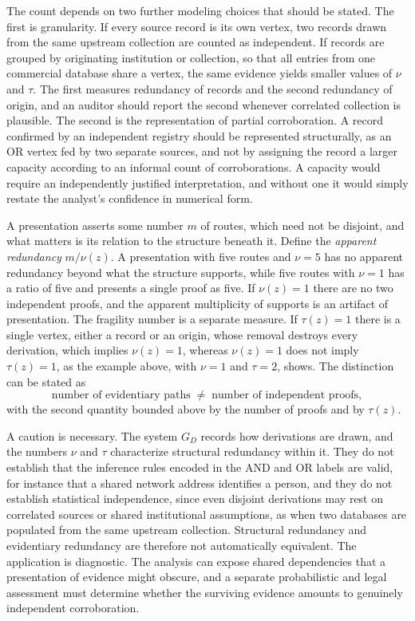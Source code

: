 \documentclass[11pt]{article}
\theoremstyle{definition}
\theoremstyle{remark}
\begin{document}
The count depends on two further modeling choices that should be stated. The first is granularity. If every source record is its own vertex, two records drawn from the same upstream collection are counted as independent. If records are grouped by originating institution or collection, so that all entries from one commercial database share a vertex, the same evidence yields smaller values of $\nu$ and $\tau$. The first measures redundancy of records and the second redundancy of origin, and an auditor should report the second whenever correlated collection is plausible. The second is the representation of partial corroboration. A record confirmed by an independent registry should be represented structurally, as an OR vertex fed by two separate sources, and not by assigning the record a larger capacity according to an informal count of corroborations. A capacity would require an independently justified interpretation, and without one it would simply restate the analyst's confidence in numerical form.

A presentation asserts some number $m$ of routes, which need not be disjoint, and what matters is its relation to the structure beneath it. Define the \emph{apparent redundancy} $m/\nu(z)$. A presentation with five routes and $\nu = 5$ has no apparent redundancy beyond what the structure supports, while five routes with $\nu = 1$ has a ratio of five and presents a single proof as five. If $\nu(z) = 1$ there are no two independent proofs, and the apparent multiplicity of supports is an artifact of presentation. The fragility number is a separate measure. If $\tau(z) = 1$ there is a single vertex, either a record or an origin, whose removal destroys every derivation, which implies $\nu(z) = 1$, whereas $\nu(z) = 1$ does not imply $\tau(z) = 1$, as the example above, with $\nu = 1$ and $\tau = 2$, shows. The distinction can be stated as
\[
\text{number of evidentiary paths} \;\neq\; \text{number of independent proofs},
\]
with the second quantity bounded above by the number of proofs and by $\tau(z)$.

A caution is necessary. The system $G_D$ records how derivations are drawn, and the numbers $\nu$ and $\tau$ characterize structural redundancy within it. They do not establish that the inference rules encoded in the AND and OR labels are valid, for instance that a shared network address identifies a person, and they do not establish statistical independence, since even disjoint derivations may rest on correlated sources or shared institutional assumptions, as when two databases are populated from the same upstream collection. Structural redundancy and evidentiary redundancy are therefore not automatically equivalent. The application is diagnostic. The analysis can expose shared dependencies that a presentation of evidence might obscure, and a separate probabilistic and legal assessment must determine whether the surviving evidence amounts to genuinely independent corroboration.
\end{document}

